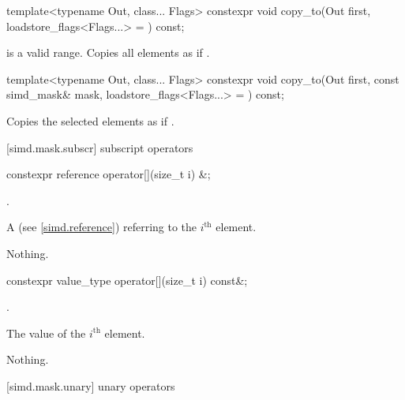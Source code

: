 \begin{itemdecl}
template<typename Out, class... Flags>
  constexpr void copy_to(Out first, loadstore_flags<Flags...> = {}) const;
\end{itemdecl}

\begin{itemdescr}
  \MaskStoreDescr
    {\tcode{[first, first + size())} is a valid range.}
    {Copies all  elements as if  \foralli.}
\end{itemdescr}

\begin{itemdecl}
template<typename Out, class... Flags>
  constexpr void copy_to(Out first, const simd_mask& mask, loadstore_flags<Flags...> = {}) const;
\end{itemdecl}

\begin{itemdescr}
  \MaskStoreDescr
  {\validMaskedRange}
  {Copies the selected elements as if  \forallmaskedi.}
\end{itemdescr}

[simd.mask.subscr]{\texorpdfstring{ subscript}{simd_mask subscript} operators}

\begin{itemdecl}
constexpr reference operator[](size_t i) &;
\end{itemdecl}

\begin{itemdescr}
  \pnum\requires
  .

  \pnum\returns
  A  (see \ref{simd.reference}) referring to the $i^\text{th}$ element.

  \pnum\throws Nothing.
\end{itemdescr}

\begin{itemdecl}
constexpr value_type operator[](size_t i) const&;
\end{itemdecl}

\begin{itemdescr}
  \pnum\requires
  .

  \pnum\returns
  The value of the $i^\text{th}$ element.

  \pnum\throws Nothing.
\end{itemdescr}

[simd.mask.unary]{\texorpdfstring{}{simd_mask} unary operators}

